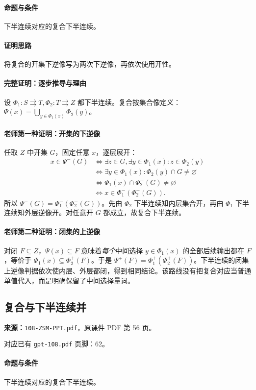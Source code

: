 \paragraph{命题与条件}下半连续对应的复合下半连续。
\paragraph{证明思路}将复合的开集下逆像写为两次下逆像，再依次使用开性。
\paragraph{完整证明：逐步推导与理由}

设 $\Phi_1:S\rightrightarrows T,\Phi_2:T\rightrightarrows Z$ 都下半连续。复合按集合像定义：$\Psi(x)=\bigcup_{y\in\Phi_1(x)}\Phi_2(y)$。
\paragraph{老师第一种证明：开集的下逆像}
任取 $Z$ 中开集 $G$，固定任意 $x$，逐层展开：
\begin{align*}
x\in\Psi^-(G)&\iff\exists z\in G,\exists y\in\Phi_1(x):z\in\Phi_2(y)\\
&\iff\exists y\in\Phi_1(x):\Phi_2(y)\cap G\ne\varnothing\\
&\iff\Phi_1(x)\cap\Phi_2^-(G)\ne\varnothing\\
&\iff x\in\Phi_1^-(\Phi_2^-(G)).
\end{align*}
所以 $\Psi^-(G)=\Phi_1^-(\Phi_2^-(G))$。先由 $\Phi_2$ 下半连续知内层集合开，再由 $\Phi_1$ 下半连续知外层逆像开。对任意开 $G$ 都成立，故复合下半连续。
\paragraph{老师第二种证明：闭集的上逆像}
对闭 $F\subseteq Z$，$\Psi(x)\subseteq F$ 意味着\emph{每个}中间选择 $y\in\Phi_1(x)$ 的全部后续输出都在 $F$，等价于 $\Phi_1(x)\subseteq\Phi_2^+(F)$。于是 $\Psi^+(F)=\Phi_1^+(\Phi_2^+(F))$。下半连续的闭集上逆像判据依次使内层、外层都闭，得到相同结论。该路线没有把复合对应当普通单值代入，而是明确保留了中间选择量词。

\clearpage\subsection{复合与下半连续并}
\textbf{来源：}\texttt{108-ZSM-PPT.pdf}，原课件 PDF 第 56 页。\par
对应已有 \texttt{gpt-108.pdf} 页脚：62。\par
\paragraph{命题与条件}下半连续对应的复合下半连续。
